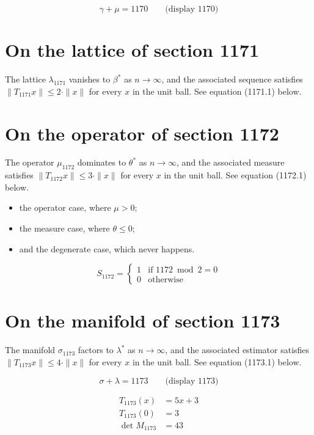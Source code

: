 \documentclass{article}
\begin{document}
$$
\gamma + \mu = 1170 \qquad \text{(display 1170)}
$$

\section{On the lattice of section 1171}
The lattice $\lambda_{1171}$ vanishes to $\beta^{*}$ as $n \to \infty$,
and the associated sequence satisfies $\|T_{1171} x\| \leq 2 \cdot \|x\|$
for every $x$ in the unit ball. See equation (1171.1) below.

\section{On the operator of section 1172}
The operator $\mu_{1172}$ dominates to $\theta^{*}$ as $n \to \infty$,
and the associated measure satisfies $\|T_{1172} x\| \leq 3 \cdot \|x\|$
for every $x$ in the unit ball. See equation (1172.1) below.

\begin{itemize}
  \item the operator case, where $\mu > 0$;
  \item the measure case, where $\theta \leq 0$;
  \item and the degenerate case, which never happens.
\end{itemize}

\begin{equation}
S_{1172} = \begin{cases} 1 & \text{if } 1172 \bmod 2 = 0 \\ 0 & \text{otherwise} \end{cases}
\end{equation}

\section{On the manifold of section 1173}
The manifold $\sigma_{1173}$ factors to $\lambda^{*}$ as $n \to \infty$,
and the associated estimator satisfies $\|T_{1173} x\| \leq 4 \cdot \|x\|$
for every $x$ in the unit ball. See equation (1173.1) below.

$$
\sigma + \lambda = 1173 \qquad \text{(display 1173)}
$$

\begin{align}
T_{1173}(x) &= 5 x + 3 \\
T_{1173}(0) &= 3 \\
\det M_{1173} &= 43
\end{align}
\end{document}
